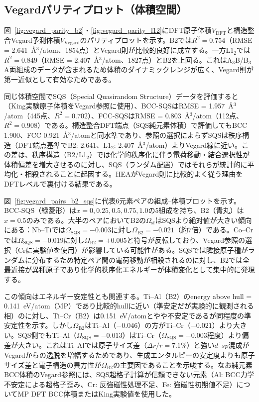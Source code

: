 \documentclass[5p,10pt]{elsarticle}
\begin{document}
\subsection{Vegardパリティプロット（体積空間）}

図~\ref{fig:vegard_parity_b2}・\ref{fig:vegard_parity_l12}にDFT原子体積$V_\text{DFT}$と構造整合Vegard予測体積$V_\text{Vegard}$のパリティプロットを示す。B2では$R^2 = 0.754$（RMSE = 2.641~\AA$^3$/atom、1854点）とVegard則が比較的良好に成立する。一方L1$_2$では$R^2 = 0.849$（RMSE = 2.407~\AA$^3$/atom、1827点）とB2を上回る。これはA$_3$B/B$_3$A両組成のデータが含まれるため体積のダイナミックレンジが広く、Vegard則が第一近似として有効なためである。

同じ体積空間でSQS（Special Quasirandom Structure）データを評価すると（King実験原子体積をVegard参照に使用）、BCC-SQSはRMSE = 1.957~\AA$^3$/atom（445点、$R^2 = 0.702$）、FCC-SQSはRMSE = 0.803~\AA$^3$/atom（112点、$R^2 = 0.908$）である。構造整合DFT端点（SQS純元素体積）で評価してもBCC 1.900、FCC 0.921~\AA$^3$/atomと同水準であり、参照の選択によらずSQSは秩序構造（DFT端点基準でB2: 2.641、L1$_2$: 2.407~\AA$^3$/atom）よりVegard線に近い。この差は、秩序構造（B2/L1$_2$）では化学的秩序化に伴う電荷移動・結合選択性が体積偏差を増大させるのに対し、SQS（ランダム配置）ではそれらが統計的に平均化・相殺されることに起因する。HEAがVegard則に比較的よく従う理由をDFTレベルで裏付ける結果である。

図~\ref{fig:vegard_pairs_b2_sqs}に代表6元素ペアの組成--体積プロットを示す。BCC-SQS（緑菱形）は$x = 0, 0.25, 0.5, 0.75, 1.0$の5組成を持ち、B2（青丸）は$x = 0.5$のみである。大半のペアにおいてB2の$\Omega_\text{sf}$はSQSより絶対値が大きい傾向にある：Nb--Tiでは$\Omega_\text{SQS} = -0.003$に対し$\Omega_\text{B2} = -0.021$（約7倍）である。Co--Crでは$\Omega_\text{SQS} = -0.019$に対し$\Omega_\text{B2} = +0.005$と符号が反転しており、Vegard参照の選択（Crに実験値を使用）が影響している可能性がある。SQSでは隣接原子種がランダムに分布するため特定ペア間の電荷移動が相殺されるのに対し、B2では全最近接が異種原子であり化学的秩序化エネルギーが体積変化として集中的に発現する。

この傾向はエネルギー安定性とも関連する。Ti--Al（B2）のenergy above hull = 0.141~eV/atom（MP）であり比較的hullに近い（準安定だが実験的に観測される相）のに対し、Ti--Cr（B2）は0.151~eV/atomとやや不安定であるが同程度の準安定性を示す。しかし$\Omega_\text{B2}$はTi--Al（$-0.046$）の方がTi--Cr（$-0.021$）より大きい。SQS側でもTi--Al（$\Omega_\text{SQS} = -0.013$）はTi--Cr（$\Omega_\text{SQS} = -0.003$程度）より偏差が大きい。これはTi--Alでは原子サイズ差（$\Delta r/\bar{r} = 7.1\%$）と強い$d$--$sp$混成がVegardからの逸脱を増幅するためであり、生成エンタルピーの安定度よりも原子サイズ差と電子構造の異方性が$\Omega_\text{B2}$の主要因であることを示唆する。なお純元素BCC体積のVegard参照には、SQS超格子計算が信頼できない元素（Al: BCC力学不安定による超格子歪み、Cr: 反強磁性処理不足、Fe: 強磁性初期値不足）についてMP DFT BCC体積またはKing実験値を使用した。
\end{document}
